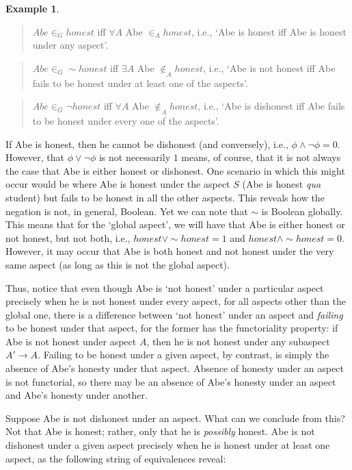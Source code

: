 \documentclass[a4paper]{book}
\theoremstyle{definition}
\newtheorem{example}{Example}[section]
\theoremstyle{definition}
\theoremstyle{definition}
\theoremstyle{theorem}
\theoremstyle{definition}
\begin{document}
\begin{example}
	\begin{quote}
		$Abe \in_G honest$ iff $\forall A$ Abe $\in_A honest$, i.e., `Abe is honest iff Abe is honest under any aspect'. 
	\end{quote}
	\begin{quote}
		$Abe \in_G \sim honest$ iff $\exists A$ Abe $\notin_A honest$, i.e., `Abe is not honest iff Abe fails to be honest under at least one of the aspects'. 
	\end{quote}
	\begin{quote}
		$Abe \in_G \neg honest$ iff $\forall A$ Abe $\notin_A honest$, i.e., `Abe is dishonest iff Abe fails to be honest under every one of the aspects'. 
	\end{quote}
	If Abe is honest, then he cannot be dishonest (and conversely), i.e., $\phi \wedge \neg \phi = 0$. However, that $\phi \vee \neg \phi$ is not necessarily $1$ means, of course, that it is not always the case that Abe is either honest or dishonest. One scenario in which this might occur would be where Abe is honest under the aspect $S$ (Abe is honest \textit{qua} student) but fails to be honest in all the other aspects. This reveals how the negation is not, in general, Boolean. Yet we can note that $\sim$ is Boolean globally. This means that for the `global aspect', we will have that Abe is either honest or not honest, but not both, i.e., $honest \vee \sim honest = 1$ and $honest \wedge \sim honest = 0$. However, it may occur that Abe is both honest and not honest under the very same aspect (as long as this is not the global aspect).\par 
	Thus, notice that even though Abe is `not honest' under a particular aspect precisely when he is not honest under every aspect, for all aspects other than the global one, there is a difference between `not honest' under an aspect and \textit{failing} to be honest under that aspect, for the former has the functoriality property: if Abe is not honest under aspect $A$, then he is not honest under any subaspect $A' \rightarrow A$. Failing to be honest under a given aspect, by contrast, is simply the absence of Abe's honesty under that aspect. Absence of honesty under an aspect is not functorial, so there may be an absence of Abe's honesty under an aspect and Abe's honesty under another.  \par 
	Suppose Abe is not dishonest under an aspect. What can we conclude from this? Not that Abe is honest; rather, only that he is \textit{possibly} honest. Abe is not dishonest under a given aspect precisely when he is honest under at least one aspect, as the following string of equivalences reveal: 

\end{example}
\end{document}

